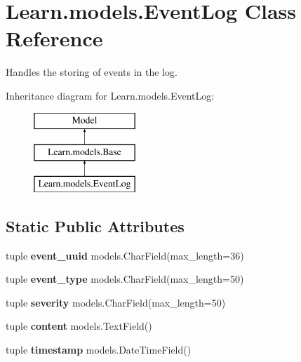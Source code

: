 \hypertarget{class_learn_1_1models_1_1_event_log}{\section{Learn.\-models.\-Event\-Log Class Reference}
\label{class_learn_1_1models_1_1_event_log}
}


Handles the storing of events in the log.  


Inheritance diagram for Learn.\-models.\-Event\-Log\-:\begin{figure}[H]
\begin{center}
\leavevmode
\includegraphics[height=3.000000cm]{class_learn_1_1models_1_1_event_log}
\end{center}
\end{figure}
\subsection*{Static Public Attributes}
\begin{DoxyCompactItemize}
\item 
\hypertarget{class_learn_1_1models_1_1_event_log_a59131c0acdcef88ad1a4c9bbe9b2dc07}{tuple {\bfseries event\-\_\-uuid} models.\-Char\-Field(max\-\_\-length=36)}\label{class_learn_1_1models_1_1_event_log_a59131c0acdcef88ad1a4c9bbe9b2dc07}

\item 
\hypertarget{class_learn_1_1models_1_1_event_log_a39076637215a65f0f9d523fa6b92e1e2}{tuple {\bfseries event\-\_\-type} models.\-Char\-Field(max\-\_\-length=50)}\label{class_learn_1_1models_1_1_event_log_a39076637215a65f0f9d523fa6b92e1e2}

\item 
\hypertarget{class_learn_1_1models_1_1_event_log_a9a9f44d173484578035963651e369573}{tuple {\bfseries severity} models.\-Char\-Field(max\-\_\-length=50)}\label{class_learn_1_1models_1_1_event_log_a9a9f44d173484578035963651e369573}

\item 
\hypertarget{class_learn_1_1models_1_1_event_log_af1e823d59a06eed2e4d7b7fdf131d0dc}{tuple {\bfseries content} models.\-Text\-Field()}\label{class_learn_1_1models_1_1_event_log_af1e823d59a06eed2e4d7b7fdf131d0dc}

\item 
\hypertarget{class_learn_1_1models_1_1_event_log_a588a2a950da0fdc2c6de2365b9ac07ef}{tuple {\bfseries timestamp} models.\-Date\-Time\-Field()}\label{class_learn_1_1models_1_1_event_log_a588a2a950da0fdc2c6de2365b9ac07ef}

\end{DoxyCompactItemize}
